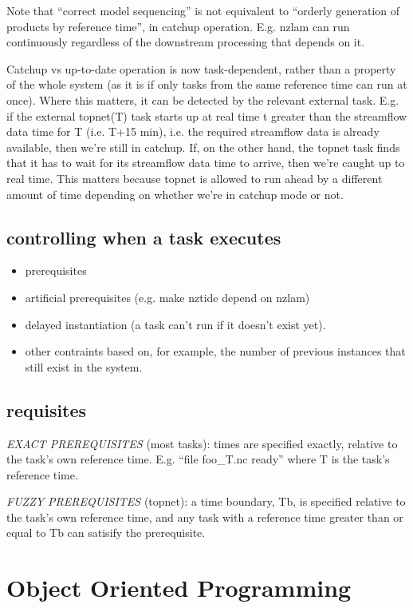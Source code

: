 \documentclass[a4paper,12pt]{amsart}
\begin{document}
Note that ``correct model sequencing'' is not equivalent to ``orderly
generation of products by reference time'', in catchup operation.  E.g.
nzlam can run continuously regardless of the downstream processing that
depends on it.

Catchup vs up-to-date operation is now task-dependent, rather than a
property of the whole system (as it is if only tasks from the same
reference time can run at once).  Where this matters, it can be detected
by the relevant external task. E.g. if the external topnet(T) task
starts up at real time t greater than the streamflow data time for T
(i.e. T+15 min), i.e. the required streamflow data is already available,
then we're still in catchup. If, on the other hand, the topnet task
finds that it has to wait for its streamflow data time to arrive, then
we're caught up to real time.  This matters because topnet is allowed to
run ahead by a different amount of time depending on whether we're in
catchup mode or not.


\subsection{controlling when a task executes}

\begin{itemize}
 \item  prerequisites
 \item artificial prerequisites (e.g. make nztide depend on nzlam)
 \item delayed instantiation (a task can't run if it doesn't exist yet).
 \item other contraints based on, for example, the number of previous instances
       that still exist in the system.
\end{itemize}


\subsection{requisites}

{\em EXACT PREREQUISITES} (most tasks): times are specified exactly,
relative to the task's own reference time.  E.g. ``file foo\_{T}.nc
ready'' where T is the task's reference time.

{\em FUZZY PREREQUISITES} (topnet): a time boundary, Tb, is specified
relative to the task's own reference time, and any task with a reference
time greater than or equal to Tb can satisify the prerequisite.


\section{Object Oriented Programming}
\end{document}
